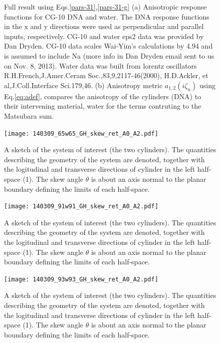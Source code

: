 \documentclass[onecolumn,letterpaper,amsmath,amssymb,floatfix,aps,superscriptaddress]{revtex4}
\begin{document}
\begin{figure}[t!]
\begin{center}
\begin{minipage}[b]{0.40\textwidth}
\end{minipage}
\caption{Full result using Eqs.\ref{pars-31},\ref{pars-31-g} (a) Anisotropic response functions for CG-10 DNA and water. The DNA response functions in the x and y directions were used as perpendicular and parallel inputs, respectively.  CG-10 and water eps2 data was provided by Dan Dryden. CG-10 data scales Wai-Yim's calculations by 4.94 and is assumed to include Na (more info in Dan Dryden email sent to us on Nov. 8, 2013).  Water data was built from lorentz oscillators R.H.French,J.Amer.Ceram Soc.,83,9,2117-46(2000), H.D.Ackler, et al,J.Coll.Interface Sci.179,46.
(b) Anisotropy metric $a_{1,2}(i\zeta_n)$ using Eq.\ref{eq:adef}, compares the anisotropy of the  cylinders (DNA) to their intervening material, water for the terms contruting to the Matsubara sum.}
\label{eiz65}
\end{center}
\end{figure} 

\begin{figure}
\centerline{\texttt{[image: 140309\_65w65\_GH\_skew\_ret\_A0\_A2.pdf]}}
\caption{A sketch of the system of interest (the two cylinders). The quantities describing the geometry of the system are 
denoted, together with the logitudinal and transverse directions of cylinder in the left half-space (1). The skew angle $\theta$ is about an axis normal to the planar boundary defining the limits of each half-space.
}
\label{fig:sketch}
\end{figure}

\begin{figure}
\centerline{\texttt{[image: 140309\_91w91\_GH\_skew\_ret\_A0\_A2.pdf]}}
\caption{A sketch of the system of interest (the two cylinders). The quantities describing the geometry of the system are 
denoted, together with the logitudinal and transverse directions of cylinder in the left half-space (1). The skew angle $\theta$ is about an axis normal to the planar boundary defining the limits of each half-space.
}
\label{fig:sketch}
\end{figure}

\begin{figure}
\centerline{\texttt{[image: 140309\_93w93\_GH\_skew\_ret\_A0\_A2.pdf]}}
\caption{A sketch of the system of interest (the two cylinders). The quantities describing the geometry of the system are 
denoted, together with the logitudinal and transverse directions of cylinder in the left half-space (1). The skew angle $\theta$ is about an axis normal to the planar boundary defining the limits of each half-space.
}
\label{fig:sketch}
\end{figure}
\end{document}
